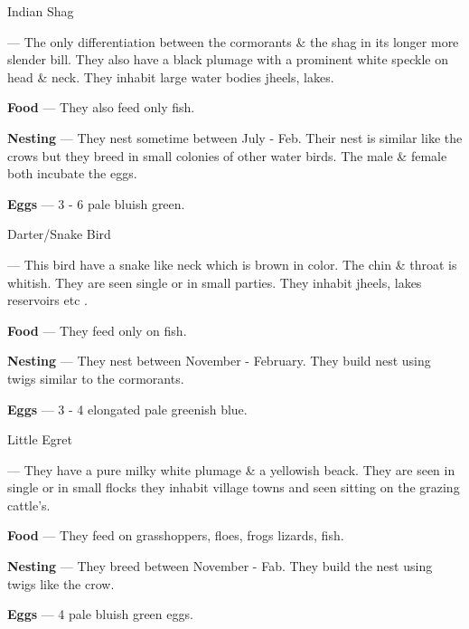 \begin{bird}{Indian Shag}

 --- The only differentiation between the cormorants \& the shag in its longer more slender bill. They also have a black plumage with a prominent white speckle on head \& neck. They inhabit large water bodies jheels, lakes.

{\large\bf Food} --- They also feed only fish.

{\large\bf Nesting} --- They nest sometime between July - Feb. Their nest is similar like the crows but they breed in small colonies of other water birds. The male \& female both incubate the eggs. 

{\large\bf Eggs} --- 3 - 6 pale bluish green.
\end{bird}

\begin{bird}{Darter/Snake Bird}

 --- This bird have a snake like neck which is brown in color. The chin \& throat is whitish. They are seen single or in small parties. They inhabit jheels, lakes reservoirs etc .

{\large\bf Food} --- They feed only on fish. 

{\large\bf Nesting} --- They nest between November - February. They build nest using twigs similar to the cormorants.

{\large\bf Eggs} --- 3 - 4 elongated pale greenish blue.
\end{bird}

\begin{bird}{Little Egret}

 --- They have a pure milky white plumage \& a yellowish beack. They are seen in single or in small flocks they inhabit village towns and seen sitting on the grazing cattle's.

{\large\bf Food} --- They feed on grasshoppers, floes, frogs lizards, fish.

{\large\bf Nesting} --- They breed between November - Fab. They build the nest using twigs like the crow.

{\large\bf Eggs} --- 4 pale bluish green eggs.
\end{bird}

